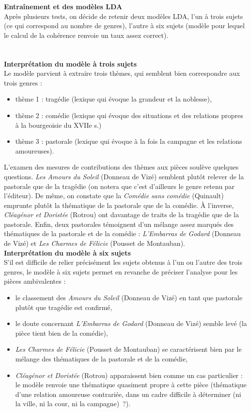 \documentclass[a4paper,twoside,12pt]{article}
\begin{document}
\textbf{Entraînement et des modèles LDA}\\
Après plusieurs tests, on décide de retenir deux modèles LDA, l'un à trois sujets (ce qui correspond au nombre de genres), l'autre à six sujets (modèle pour lequel le calcul de la cohérence renvoie un taux assez correct).\\
\\
\\
\textbf{Interprétation du modèle à trois sujets}\\
Le modèle parvient à extraire trois thèmes, qui semblent bien correspondre aux trois genres :
\begin{itemize}
\item thème 1 : tragédie (lexique qui évoque la grandeur et la noblesse),
\item thème 2 : comédie (lexique qui évoque des situations et des relations propres à la bourgeoisie du XVIIe s.)
\item thème 3 : pastorale (lexique qui évoque à la fois la campagne et les relations amoureuses).
\end{itemize}

L'examen des mesures de contributions des thèmes aux pièces soulève quelques questions. \textit{Les Amours du Soleil} (Donneau de Vizé) semblent plutôt relever de la pastorale que de la tragédie (on notera que c'est d'ailleurs le genre retenu par l'éditeur). De même, on constate que la \textit{Comédie sans comédie} (Quinault) emprunte plutôt la thématique de la pastorale que de la comédie. À l'inverse, \textit{Cléagénor et Doristée} (Rotrou) ont davantage de traits de la tragédie que de la pastorale. Enfin, deux pastorales témoignent d'un mélange assez marqués des thématiques de la pastorale et de la comédie : \textit{L'Embarras de Godard} (Donneau de Vizé) et \textit{Les Charmes de Félicie} (Pousset de Montauban).\\

\textbf{Interprétation du modèle à six sujets}\\
S'il est difficile de relier précisément les sujets obtenus à l'un ou l'autre des trois genres, le modèle à six sujets permet en revanche de préciser l'analyse pour les pièces ambivalentes :
\begin{itemize}
\item le classement des \textit{Amours du Soleil} (Donneau de Vizé) en tant que pastorale plutôt que tragédie est confirmé,
\item le doute concernant \textit{L'Embarras de Godard} (Donneau de Vizé) semble levé (la pièce tient bien de la comédie),
\item \textit{Les Charmes de Félicie} (Pousset de Montauban) se caractérisent bien par le mélange des thématiques de la pastorale et de la comédie,
\item \textit{Cléagénor et Doristée} (Rotrou) apparaissent bien comme un cas particulier : le modèle renvoie une thématique quasiment propre à cette pièce (thématique d'une relation amoureuse contrariée, dans un cadre difficile à déterminer (ni la ville, ni la cour, ni la campagne)\ ?).
\end{itemize}
\end{document}
